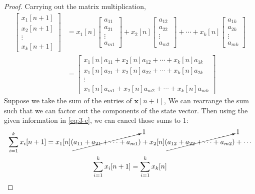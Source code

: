 \documentclass[]{article}
\numberwithin{equation}{section}
\begin{document}
\begin{proof}
Carrying out the matrix multiplication,
\begin{align}
	\begin{bmatrix}
	x_1[n + 1] \\
	x_2[n + 1] \\
	\vdots \\
	x_k[n + 1]
	\end{bmatrix}
	&= x_1[n] \begin{bmatrix}
	a_{11} \\
	a_{21} \\
	\vdots \\
	a_{m1}
	\end{bmatrix} + 
	x_2[n] \begin{bmatrix}
	a_{12} \\
	a_{22} \\
	\vdots \\
	a_{m2}
	\end{bmatrix} + \cdots + 
	x_k[n] \begin{bmatrix}
	a_{1k} \\
	a_{2k} \\
	\vdots \\
	a_{mk}
	\end{bmatrix} \\
	&= \begin{bmatrix}
	x_1[n] a_{11} + x_2[n] a_{12} + \cdots + x_k[n] a_{1k} \\
	x_1[n] a_{21} + x_2[n] a_{22} + \cdots + x_k[n] a_{2k} \\
	\vdots \\
	x_1[n] a_{m1} + x_2[n] a_{m2} + \cdots + x_k[n] a_{mk}
	\end{bmatrix}
\end{align}
Suppose we take the sum of the entries of \(\mathbf{x}[n + 1]\), We can rearrange the sum such that we can factor out the components of the state vector. Then using the given information in \autoref{eq:3-e}, we can cancel those sums to 1: 
\begin{gather}
	\sum_{i = 1}^{k} x_i[n + 1] = x_1[n] (\cancelto{1}{a_{11} + a_{21} + \cdots + a_{m1}}) + x_2[n] (\cancelto{1}{a_{12} + a_{22} + \cdots + a_{m2}}) + \cdots \\
	\sum_{i = 1}^{k} x_i[n + 1] = \sum_{i = 1}^{k} x_k[n]
\end{gather}
\end{proof}

\end{document}
